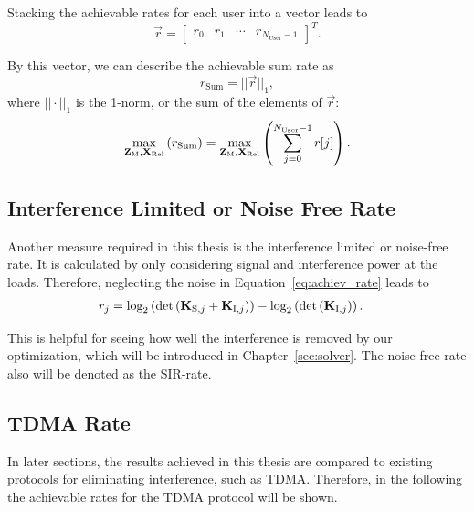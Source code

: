 Stacking the achievable rates for each user into a vector leads to 
\begin{equation}
\label{eq:achiev_vec}
\vec{r} =
\begin{bmatrix}
r_0 & r_1 & \cdots & r_{N_\text{User}-1}
\end{bmatrix}^T.
\end{equation}

By this vector, we can describe the achievable sum rate as
\begin{equation}
\label{eq:achiev_sum_rate}
r_\text{Sum} = ||\vec{r}||_1,
\end{equation}
where $||\cdot||_1$ is the 1-norm, or the sum of the elements of $\vec{r}$:
\begin{equation}
\label{eq:achiev_sum_rate}
\max_{\mathbf{Z}_\text{M},\mathbf{X}_\text{Rel}}\left(r_\text{Sum}\right) = \max_{\mathbf{Z}_\text{M},\mathbf{X}_\text{Rel}}\left(\sum_{j=0}^{N_\text{User}-1} r[j]\right).
\end{equation}

\subsection{Interference Limited or Noise Free Rate}
\label{sec:sir_rate}
Another measure required in this thesis is the interference limited or noise-free rate.
It is calculated by only considering signal and interference power at the loads.
Therefore, neglecting the noise in Equation~\ref{eq:achiev_rate} leads to
\begin{align}
\label{eq:sir_rate}
r_j &=\text{log}_2\left(\text{det}\left(\mathbf{K}_{\text{S},j}+\mathbf{K}_{\text{I},j}\right)\right) -
	     	\text{log}_2\left(\text{det}\left(\mathbf{K}_{\text{I},j}\right)\right).
\end{align}

This is helpful for seeing how well the interference is removed by our optimization, which will be introduced in Chapter~\ref{sec:solver}.
The noise-free rate also will be denoted as the SIR-rate.


\subsection{TDMA Rate}
\label{sec:tdma_rate}
In later sections, the results achieved in this thesis are compared to existing protocols for eliminating interference, such as TDMA.
Therefore, in the following the achievable rates for the TDMA protocol will be shown.

